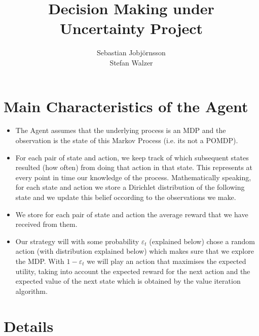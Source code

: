 \documentclass{scrartcl}
\begin{document}
    \author{Sebastian Jobjörnsson\\Stefan Walzer}
    \title{Decision Making under Uncertainty Project}
    \maketitle
    \section{Main Characteristics of the Agent}
    
    \begin{itemize}
        \item The Agent assumes that the underlying process is an MDP and the observation is the state of this Markov Process (i.e. its not a POMDP).
        \item For each pair of state and action, we keep track of which subsequent states resulted (how often) from doing that action in that state. This represents at every point in time our knowledge of the process. Mathematically speaking, for each state and action we store a Dirichlet distribution of the following state and we update this belief occording to the observations we make.
        \item We store for each pair of state and action the average reward that we have received from them.
        \item Our strategy will with some probability $ε_t$ (explained below) chose a random action (with distribution explained below) which makes sure that we explore the MDP. With $1 - ε_t$ we will play an action that maximises the expected utility, taking into account the expected reward for the next action and the expected value of the next state which is obtained by the value iteration algorithm.
    \end{itemize}
    
    \section{Details}
    
\end{document}
